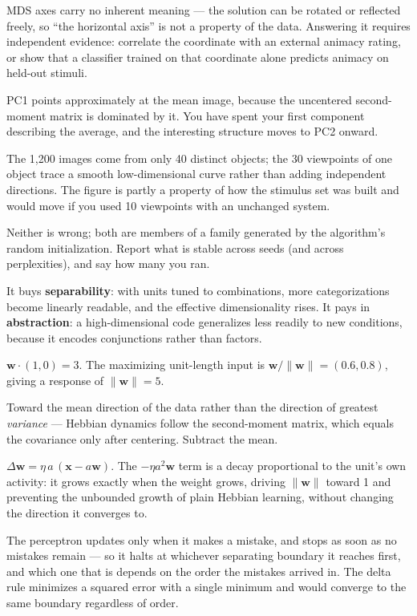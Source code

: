 \documentclass[11pt]{article}
\begin{document}
 MDS axes carry no inherent meaning --- the solution can be rotated or
reflected freely, so ``the horizontal axis'' is not a property of the data.
Answering it requires independent evidence: correlate the coordinate with an
external animacy rating, or show that a classifier trained on that coordinate
alone predicts animacy on held-out stimuli.

 PC1 points approximately at the mean image, because the uncentered
second-moment matrix is dominated by it. You have spent your first component
describing the average, and the interesting structure moves to PC2 onward.

 The 1,200 images come from only 40 distinct objects; the 30 viewpoints
of one object trace a smooth low-dimensional curve rather than adding
independent directions. The figure is partly a property of how the stimulus set
was built and would move if you used 10 viewpoints with an unchanged system.

 Neither is wrong; both are members of a family generated by the
algorithm's random initialization. Report what is stable across seeds (and
across perplexities), and say how many you ran.

 It buys \textbf{separability}: with units tuned to combinations, more
categorizations become linearly readable, and the effective dimensionality
rises. It pays in \textbf{abstraction}: a high-dimensional code generalizes less
readily to new conditions, because it encodes conjunctions rather than factors.

 $\boldsymbol{w}\cdot(1,0) = 3$. The maximizing unit-length input is
$\boldsymbol{w}/\|\boldsymbol{w}\| = (0.6, 0.8)$, giving a response of
$\|\boldsymbol{w}\| = 5$.

 Toward the mean direction of the data rather than the direction of
greatest \emph{variance} --- Hebbian dynamics follow the second-moment matrix,
which equals the covariance only after centering. Subtract the mean.

 $\Delta\boldsymbol{w} = \eta\,a\,(\boldsymbol{x} - a\boldsymbol{w})$.
The $-\eta a^2 \boldsymbol{w}$ term is a decay proportional to the unit's own
activity: it grows exactly when the weight grows, driving $\|\boldsymbol{w}\|$
toward 1 and preventing the unbounded growth of plain Hebbian learning, without
changing the direction it converges to.

 The perceptron updates only when it makes a mistake, and stops as soon
as no mistakes remain --- so it halts at whichever separating boundary it reaches
first, and which one that is depends on the order the mistakes arrived in. The
delta rule minimizes a squared error with a single minimum and would converge to
the same boundary regardless of order.
\end{document}
